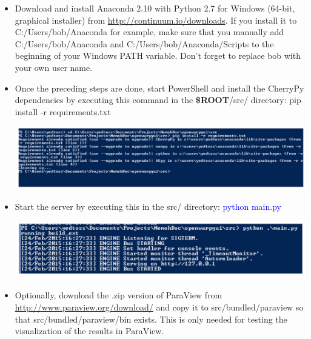 \documentclass[12pt]{article}
\newcommand{\ROOT}{{\textbf{\$ROOT}}}
\begin{document}
\begin{itemize}
	
	\item Download and install Anaconda 2.10 with Python 2.7 for Windows (64-bit, graphical installer) from \url{http://continuum.io/downloads}.
	If you install it to C:/Users/bob/Anaconda for example, make sure that you manually add C:/Users/bob/Anaconda and C:/Users/bob/Anaconda/Scripts to the beginning of your Windows PATH variable. Don't forget to replace bob with your own user name.
	
	
	\item Once the preceding steps are done, start PowerShell and install the CherryPy dependencies by executing this command in the \ROOT{}/src/ directory:
{\color{blue}pip install -r requirements.txt}

\vspace{\abovedisplayskip}
\begin{minipage}{\linewidth}
	\centering
	\includegraphics[scale=0.75]{img/2}
\end{minipage}
\vspace{\belowdisplayskip}

 \item Start the server by executing this in the src/ directory:
 \textcolor{blue}{python main.py}
 
 \vspace{\abovedisplayskip}
 \begin{minipage}{\linewidth}
 	\centering
 	\includegraphics[scale=0.75]{img/3}
 \end{minipage}
 \vspace{\belowdisplayskip}
 
 \item Optionally, download the .zip version of ParaView from \url{http://www.paraview.org/download/}  and copy it to src/bundled/paraview so that src/bundled/paraview/bin exists. This is only needed for testing the visualization of the results in ParaView.
 

\end{itemize}
\end{document}
